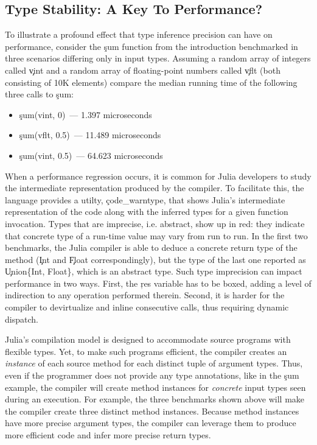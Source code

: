 \documentclass[sigplan,review,anonymous]{acmart}
\begin{document}
\subsection{Type Stability: A Key To Performance?}

To illustrate a profound effect that type inference precision can have on
performance, consider the \c{sum} function from the introduction benchmarked in
three scenarios differing only in input types. Assuming a random array of integers
called \c{vint} and a random array of floating-point numbers called \c{vflt}
(both consisting of 10K elements)
compare the median running time of the following three calls to \c{sum}:
\begin{itemize}

  \item \c{sum(vint, 0)}~--- 1.397 microseconds
  \item \c{sum(vflt, 0.5)}~--- 11.489 microseconds
  \item \c{sum(vint, 0.5)}~--- 64.623 microseconds
\end{itemize}

When a performance regression occurs, it is common for Julia developers to study
the intermediate representation produced by the compiler. To facilitate this,
the language provides a utilty, \c{code_warntype}, that shows Julia's
intermediate representation of the code along with the inferred types for a given function
invocation. Types that are imprecise, i.e. abstract, show up in red: they
indicate that concrete type of a run-time value may vary from run to run.
%
In the first two benchmarks, the Julia compiler is able to deduce a concrete return
type of the method (\c{Int} and \c{Float} correspondingly), but the type of the last one
reported as \c{Union\{Int, Float\}}, which is an abstract type.
%
Such type imprecision can impact performance in two ways. First,
the \c{res} variable has to be boxed, adding a level of indirection to
any operation performed therein. Second, it is harder for
the compiler to devirtualize and inline consecutive calls, thus requiring
dynamic dispatch.

Julia's compilation model is designed to accommodate source programs
with flexible types. Yet, to make such programs efficient, the compiler
creates an \emph{instance} of each source method for each distinct tuple of
argument types. Thus, even if the programmer does not provide any type
annotations, like in the \c{sum} example, the compiler will create method
instances for \emph{concrete} input types seen during
an execution. For example, the three benchmarks shown above will make the
compiler create three distinct method instances.
Because method instances have more precise argument types, the compiler can
leverage them to produce more efficient code and infer more precise return types.
\end{document}
